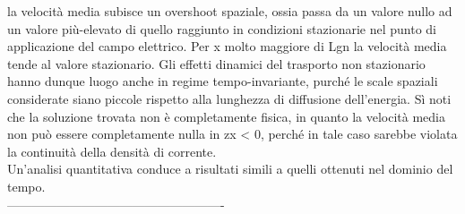 la velocità media subisce un overshoot spaziale, ossia passa da un
valore nullo ad un valore più-elevato di quello raggiunto in condizioni stazionarie
nel punto di applicazione del campo elettrico. Per x molto maggiore di Lgn la
velocità media tende al valore stazionario. Gli effetti dinamici del trasporto non
stazionario hanno dunque luogo anche in regime tempo-invariante, purché le scale
spaziali considerate siano piccole rispetto alla lunghezza di diffusione dell’energia.
Sì noti che la soluzione trovata non è completamente fisica, in quanto la velocità media non può essere completamente nulla in zx < 0, perché in tale caso sarebbe
violata la continuità della densità di corrente. \\
Un’analisi quantitativa conduce a risultati simili a quelli ottenuti nel dominio del
tempo.\\
----------------------------------------------------\\

